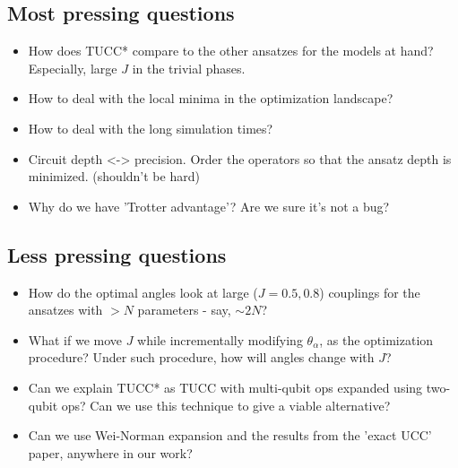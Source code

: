 \documentclass[10pt, a4paper]{article}
\begin{document}
\subsection*{Most pressing questions}

\begin{itemize}
\item How does TUCC* compare to the other ansatzes for the models at hand? Especially, large $J$ in the trivial phases.
\item How to deal with the local minima in the optimization landscape?
\item How to deal with the long simulation times?
\item Circuit depth <-> precision. Order the operators so that the ansatz depth is minimized. (shouldn't be hard)
\item Why do we have 'Trotter advantage'? Are we sure it's not a bug?
\end{itemize}

\subsection*{Less pressing questions}

\begin{itemize}
	\item How do the optimal angles look at large ($J=0.5,0.8$) couplings for the ansatzes with $>N$ parameters - say, $\sim2N$?
	\item What if we move $J$ while incrementally modifying $\theta_{\alpha}$, as the optimization procedure? Under such procedure, how will angles change with $J$?
	\item Can we explain TUCC* as TUCC with multi-qubit ops expanded using two-qubit ops? Can we use this technique to give a viable alternative?
	\item Can we use Wei-Norman expansion and the results from the 'exact UCC' paper, anywhere in our work?
\end{itemize}
\end{document}
